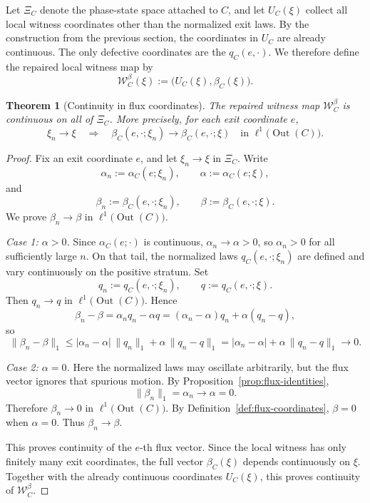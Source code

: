 \documentclass[12pt,a4paper]{article}
\newtheorem{theorem}{Theorem}[section]
\theoremstyle{definition}
\DeclareMathOperator{\Out}{Out}
\begin{document}
Let $\Xi_C$ denote the phase-state space attached to $C$, and let $U_C(\xi)$ collect all local witness coordinates other than the normalized exit laws. By the construction from the previous section, the coordinates in $U_C$ are already continuous. The only defective coordinates are the $q_C(e,\cdot)$. We therefore define the repaired local witness map by
\[
\mathcal W_C^\beta(\xi):=\big(U_C(\xi),\beta_C(\xi)\big).
\]

\begin{theorem}[Continuity in flux coordinates]\label{thm:flux-continuity}
The repaired witness map $\mathcal W_C^\beta$ is continuous on all of $\Xi_C$. More precisely, for each exit coordinate $e$,
\[
\xi_n\to \xi
\quad\Longrightarrow\quad
\beta_C(e,\cdot;\xi_n)\to \beta_C(e,\cdot;\xi)
\quad\text{in }\ell^1\big(\Out(C)\big).
\]
\end{theorem}

\begin{proof}
Fix an exit coordinate $e$, and let $\xi_n\to \xi$ in $\Xi_C$. Write
\[
\alpha_n:=\alpha_C(e;\xi_n),
\qquad
\alpha:=\alpha_C(e;\xi),
\]
and
\[
\beta_n:=\beta_C(e,\cdot;\xi_n),
\qquad
\beta:=\beta_C(e,\cdot;\xi).
\]
We prove $\beta_n\to \beta$ in $\ell^1\big(\Out(C)\big)$.

\smallskip

\noindent\emph{Case 1: $\alpha>0$.}
Since $\alpha_C(e;\cdot)$ is continuous, $\alpha_n\to\alpha>0$, so $\alpha_n>0$ for all sufficiently large $n$. On that tail, the normalized laws $q_C(e,\cdot;\xi_n)$ are defined and vary continuously on the positive stratum. Set
\[
q_n:=q_C(e,\cdot;\xi_n),
\qquad
q:=q_C(e,\cdot;\xi).
\]
Then $q_n\to q$ in $\ell^1\big(\Out(C)\big)$. Hence
\[
\beta_n-\beta
=
\alpha_n q_n-\alpha q
=
(\alpha_n-\alpha)q_n+\alpha(q_n-q),
\]
so
\[
\|\beta_n-\beta\|_1
\le
|\alpha_n-\alpha|\,\|q_n\|_1+\alpha\,\|q_n-q\|_1
=
|\alpha_n-\alpha|+\alpha\,\|q_n-q\|_1
\longrightarrow 0.
\]

\smallskip

\noindent\emph{Case 2: $\alpha=0$.}
Here the normalized laws may oscillate arbitrarily, but the flux vector ignores that spurious motion. By Proposition~\ref{prop:flux-identities},
\[
\|\beta_n\|_1=\alpha_n\longrightarrow \alpha=0.
\]
Therefore $\beta_n\to 0$ in $\ell^1\big(\Out(C)\big)$. By Definition~\ref{def:flux-coordinates}, $\beta=0$ when $\alpha=0$. Thus $\beta_n\to \beta$.

This proves continuity of the $e$-th flux vector. Since the local witness has only finitely many exit coordinates, the full vector $\beta_C(\xi)$ depends continuously on $\xi$. Together with the already continuous coordinates $U_C(\xi)$, this proves continuity of $\mathcal W_C^\beta$.
\end{proof}
\end{document}
